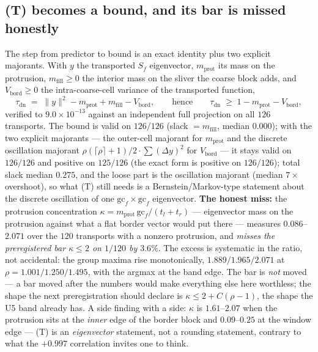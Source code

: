 \documentclass[11pt,a4paper]{article}
\begin{document}
\subsection{(T) becomes a bound, and its bar is missed honestly}
The step from predictor to bound is an exact identity plus two explicit majorants. With $y$ the
transported $S_f$ eigenvector, $m_{\mathrm{prot}}$ its mass on the protrusion,
$m_{\mathrm{fill}}\ge0$ the interior mass on the sliver the coarse block adds, and
$V_{\mathrm{bord}}\ge0$ the intra-coarse-cell variance of the transported function,
\[
\tau_{\mathrm{dn}} \;=\; \|y\|^2 - m_{\mathrm{prot}} + m_{\mathrm{fill}} - V_{\mathrm{bord}},
\qquad\text{hence}\qquad
\tau_{\mathrm{dn}} \;\ge\; 1 - m_{\mathrm{prot}} - V_{\mathrm{bord}},
\]
verified to $9.0\times10^{-13}$ against an independent full projection on all $126$ transports.
The bound is valid on $126/126$ (slack $=m_{\mathrm{fill}}$, median $0.000$); with the two
explicit majorants --- the outer-cell majorant for $m_{\mathrm{prot}}$ and the discrete
oscillation majorant $\rho(\lceil\rho\rceil{+}1)/2\cdot\sum(\Delta y)^2$ for $V_{\mathrm{bord}}$
--- it stays valid on $126/126$ and positive on $125/126$ (the exact form is positive on
$126/126$); total slack median $0.275$, and the loose part is the oscillation majorant (median
$7\times$ overshoot), so what (T) still needs is a Bernstein/Markov-type statement about the
discrete oscillation of one $\mathrm{gc}_f\times\mathrm{gc}_f$ eigenvector. \textbf{The honest
miss:} the protrusion concentration
$\kappa=m_{\mathrm{prot}}\,\mathrm{gc}_f/(t_l+t_r)$ --- eigenvector mass on the protrusion against
what a flat border vector would put there --- measures $0.086$--$2.071$ over the $120$ transports
with a nonzero protrusion, and \emph{misses the preregistered bar $\kappa\le2$ on $1/120$ by
$3.6\%$}. The excess is systematic in the ratio, not accidental: the group maxima rise
monotonically, $1.889/1.965/2.071$ at $\rho=1.001/1.250/1.495$, with the argmax at the band edge.
The bar is \emph{not} moved --- a bar moved after the numbers would make everything else here
worthless; the shape the next preregistration should declare is $\kappa\le2+C(\rho-1)$, the shape
the U5 band already has. A side finding with a side: $\kappa$ is $1.61$--$2.07$ when the
protrusion sits at the \emph{inner} edge of the border block and $0.09$--$0.25$ at the window
edge --- (T) is an \emph{eigenvector} statement, not a rounding statement, contrary to what the
$+0.997$ correlation invites one to think.
\end{document}
